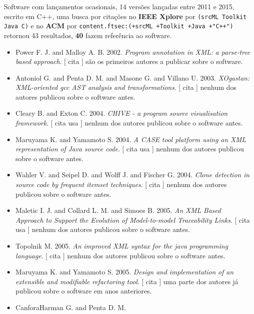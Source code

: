Software com lançamentos ocasionais,
14 versões lançadas
entre 2011 e 2015,
escrito em C++,
uma busca por citações no {\bf IEEE Xplore} por
\texttt{(srcML Toolkit Java C)}
e no {\bf ACM} por
\texttt{content.ftsec:(+srcML +Toolkit +Java +"C++")}
retornou
43 resultados,
{\bf 40} fazem referência ao software.

\begin{itemize}
\item Power F. J. and Malloy A. B.
      2002.
        \textit{ Program annotation in XML: a parse-tree based approach}.
      [
          cita
      ]
são os primeiros autores a publicar sobre o software.
\item Antoniol G. and Penta D. M. and Masone G. and Villano U.
      2003.
        \textit{ XOgastan: XML-oriented gcc AST analysis and transformations}.
      [
          cita
      ]
nenhum dos autores publicou sobre o software antes.
\item Cleary B. and Exton C.
      2004.
        \textit{ CHIVE - a program source visualisation framework}.
      [
          cita
          usa
      ]
nenhum dos autores publicou sobre o software antes.
\item Maruyama K. and Yamamoto S.
      2004.
        \textit{ A CASE tool platform using an XML representation of Java source code}.
      [
          cita
          usa
      ]
nenhum dos autores publicou sobre o software antes.
\item Wahler V. and Seipel D. and Wolff J. and Fischer G.
      2004.
        \textit{ Clone detection in source code by frequent itemset techniques}.
      [
          cita
      ]
nenhum dos autores publicou sobre o software antes.
\item Maletic I. J. and Collard L. M. and Simoes B.
      2005.
        \textit{ An XML Based Approach to Support the Evolution of Model-to-model Traceability Links}.
      [
          cita
          usa
      ]
nenhum dos autores publicou sobre o software antes.
\item Topolnik M.
      2005.
        \textit{ An improved XML syntax for the java programming language}.
      [
          cita
      ]
nenhum dos autores publicou sobre o software antes.
\item Maruyama K. and Yamamoto S.
      2005.
        \textit{ Design and implementation of an extensible and modifiable refactoring tool}.
      [
          cita
      ]
uma parte dos autores já publicou sobre o software em anos anteriores.
\item CanforaHarman G. and Penta D. M.

\end{itemize}
